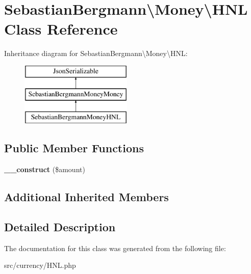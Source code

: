 \hypertarget{classSebastianBergmann_1_1Money_1_1HNL}{}\section{Sebastian\+Bergmann\textbackslash{}Money\textbackslash{}H\+N\+L Class Reference}
\label{classSebastianBergmann_1_1Money_1_1HNL}
Inheritance diagram for Sebastian\+Bergmann\textbackslash{}Money\textbackslash{}H\+N\+L\+:\begin{figure}[H]
\begin{center}
\leavevmode
\includegraphics[height=3.000000cm]{classSebastianBergmann_1_1Money_1_1HNL}
\end{center}
\end{figure}
\subsection*{Public Member Functions}
\begin{DoxyCompactItemize}
\item 
\hypertarget{classSebastianBergmann_1_1Money_1_1HNL_aaa2ce7692c4ef661bd2d6e4d6769f950}{}{\bfseries \+\_\+\+\_\+construct} (\$amount)\label{classSebastianBergmann_1_1Money_1_1HNL_aaa2ce7692c4ef661bd2d6e4d6769f950}

\end{DoxyCompactItemize}
\subsection*{Additional Inherited Members}


\subsection{Detailed Description}


The documentation for this class was generated from the following file\+:\begin{DoxyCompactItemize}
\item 
src/currency/H\+N\+L.\+php\end{DoxyCompactItemize}
